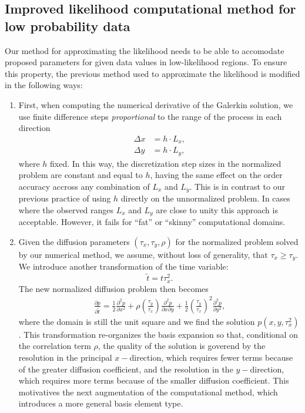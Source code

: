 \documentclass[10pt]{article}
\begin{document}
\subsection{Improved likelihood computational method for low
  probability data} \label{sec:improvements} Our method for
approximating the likelihood needs to be able to accomodate proposed
parameters for given data values in low-likelihood regions. To ensure
this property, the previous method used to approximate the likelihood
is modified in the following ways:
\begin{enumerate}
\item First, when computing the numerical derivative of the Galerkin
  solution, we use finite difference steps \textit{proportional} to
  the range of the process in each direction
  \begin{align}
    \Delta x &= h \cdot L_x, \\
    \Delta y &= h \cdot L_y,
  \end{align}
  where $h$ fixed. In this way, the discretization step sizes in the
  normalized problem are constant and equal to $h$, having the same
  effect on the order accuracy accross any combination of $L_x$ and
  $L_y$. This is in contrast to our previous practice of using $h$
  directly on the unnormalized problem. In cases where the observed
  ranges $L_x$ and $L_y$ are close to unity this approach is
  acceptable. However, it fails for ``fat'' or ``skinny''
  computational domains.

\item Given the diffusion parameters $(\tau_x, \tau_y, \rho)$ for the
  normalized problem solved by our numerical method, we assume,
  without loss of generality, that $\tau_x \geq \tau_y$. We introduce
  another transformation of the time variable:
  \[ \tilde{t} = t\tau_x^2.\]
  The new normalized diffusion problem then becomes
  \begin{align}
    \frac{\partial p}{\partial \tilde{t}} = \frac{1}{2}
    \frac{\partial^2 p}{\partial x^2} + \rho
    \left(\frac{\tau_y}{\tau_x}\right)\frac{\partial^2 p}{\partial
      x\partial y} + \frac{1}{2}\left(\frac{\tau_y}{\tau_x}\right)^2
    \frac{\partial^2 p}{\partial y^2}, \label{eq:new-normalized}
  \end{align}
  where the domain is still the unit square and we find the solution
  $p(x,y,\tau_x^2)$. This transformation re-organizes the basis
  expansion so that, conditional on the correlation term $\rho$, the
  quality of the solution is goverend by the resolution in the
  principal $x-$direction, which requires fewer terms because of the
  greater diffusion coefficient, and the resolution in the
  $y-$direction, which requires more terms because of the smaller
  diffusion coefficient. This motivatives the next augmentation of the
  computational method, which introduces a more general basis element
  type.


\end{enumerate}
\end{document}
